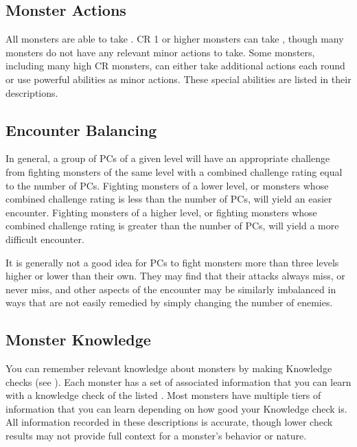     \subsection{Monster Actions}
        All monsters are able to take .
        CR 1 or higher monsters can take , though many monsters do not have any relevant minor actions to take.
        Some monsters, including many high CR monsters, can either take additional actions each round or use powerful abilities as minor actions.
        These special abilities are listed in their descriptions.

    \subsection{Encounter Balancing}\label{Encounter Balancing}
        In general, a group of PCs of a given level will have an appropriate challenge from fighting monsters of the same level with a combined challenge rating equal to the number of PCs.
        Fighting monsters of a lower level, or monsters whose combined challenge rating is less than the number of PCs, will yield an easier encounter.
        Fighting monsters of a higher level, or fighting monsters whose combined challenge rating is greater than the number of PCs, will yield a more difficult encounter.

        It is generally not a good idea for PCs to fight monsters more than three levels higher or lower than their own.
        They may find that their attacks always miss, or never miss, and other aspects of the encounter may be similarly imbalanced in ways that are not easily remedied by simply changing the number of enemies.

    \subsection{Monster Knowledge}
        You can remember relevant knowledge about monsters by making Knowledge checks (see ).
        Each monster has a set of associated information that you can learn with a knowledge check of the listed .
        Most monsters have multiple tiers of information that you can learn depending on how good your Knowledge check is.
        All information recorded in these descriptions is accurate, though lower check results may not provide full context for a monster's behavior or nature.


